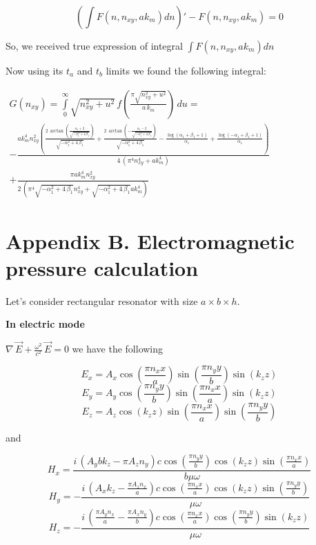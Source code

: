 \documentclass[11pt]{article}
\begin{document}
\[\left( \int F\left(n, n_{xy}, ak_m\right) dn \right)'-F\left(n, n_{xy}, ak_m\right) = 0\]

    So, we received true expression of integral
\(\int F\left(n, n_{xy}, ak_m\right) dn\)

Now using its \(t_a\) and \(t_b\) limits we found the following
integral:

    \(\begin{array}{r}  G\left(n_{xy}\right) = \int\limits_{0}^{\infty}\sqrt{n_{xy}^2+u^2}\, f\left(\frac{\pi\sqrt{n_{xy}^2+u^2}}{a\,k_m}\right)\,d{u} = \\  -\frac{\mathit{ak}_{m}^{4} n_{\mathit{xy}}^{2} {\left(\frac{2 \, \arctan\left(\frac{\alpha_{1} + 2}{\sqrt{-\alpha_{1}^{2} + 4 \, \beta_{1}}}\right)}{\sqrt{-\alpha_{1}^{2} + 4 \, \beta_{1}}} + \frac{2 \, \arctan\left(-\frac{\alpha_{1} - 2}{\sqrt{-\alpha_{1}^{2} + 4 \, \beta_{1}}}\right)}{\sqrt{-\alpha_{1}^{2} + 4 \, \beta_{1}}} - \frac{\log\left(\alpha_{1} + \beta_{1} + 1\right)}{\alpha_{1}} + \frac{\log\left(-\alpha_{1} + \beta_{1} + 1\right)}{\alpha_{1}}\right)}}{4 \, {\left(\pi^{4} n_{\mathit{xy}}^{4} + \mathit{ak}_{m}^{4}\right)}} \\ +\frac{\pi \mathit{ak}_{m}^{4} n_{\mathit{xy}}^{2}}{2 \, {\left(\pi^{4} \sqrt{-\alpha_{1}^{2} + 4 \, \beta_{1}} n_{\mathit{xy}}^{4} + \sqrt{-\alpha_{1}^{2} + 4 \, \beta_{1}} \mathit{ak}_{m}^{4}\right)}} \end{array}\)

    \section{Appendix B. Electromagnetic pressure
calculation}\label{appendix-b.-electromagnetic-pressure-calculation}

    Let's consider rectangular resonator with size \(a \times b \times h\).

    \textbf{In electric mode}

\(\nabla\,\vec{E} + \frac{\omega^2}{c^2}\,\vec{E} = 0\) we have the
following

\[E_{x} = A_{x} \cos\left(\frac{\pi n_{x} x}{a}\right) \sin\left(\frac{\pi n_{y} y}{b}\right) \sin\left(k_{z} z\right)\]
\[E_{y} = A_{y} \cos\left(\frac{\pi n_{y} y}{b}\right) \sin\left(\frac{\pi n_{x} x}{a}\right) \sin\left(k_{z} z\right)\]
\[E_{z} = A_{z} \cos\left(k_{z} z\right) \sin\left(\frac{\pi n_{x} x}{a}\right) \sin\left(\frac{\pi n_{y} y}{b}\right)\]

and

\[H_{x} = \frac{i \, {\left(A_{y} b k_{z} - \pi A_{z} n_{y}\right)} c \cos\left(\frac{\pi n_{y} y}{b}\right) \cos\left(k_{z} z\right) \sin\left(\frac{\pi n_{x} x}{a}\right)}{b \mu \omega}\]
\[H_{y} = -\frac{i \, {\left(A_{x} k_{z} - \frac{\pi A_{z} n_{x}}{a}\right)} c \cos\left(\frac{\pi n_{x} x}{a}\right) \cos\left(k_{z} z\right) \sin\left(\frac{\pi n_{y} y}{b}\right)}{\mu \omega}\]
\[H_{z} = -\frac{i \, {\left(\frac{\pi A_{y} n_{x}}{a} - \frac{\pi A_{x} n_{y}}{b}\right)} c \cos\left(\frac{\pi n_{x} x}{a}\right) \cos\left(\frac{\pi n_{y} y}{b}\right) \sin\left(k_{z} z\right)}{\mu \omega}\]
\end{document}
